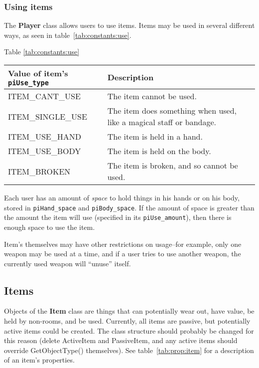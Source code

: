 \documentclass[12pt]{article}
\newcommand{\class}[1]{\textbf{#1}}
\newcommand{\prop}[1]{\texttt{#1}}
\begin{document}
\subsubsection{Using items}

The \class{Player} class allows users to use items.  Items may be used
in several different ways, as seen in table~\ref{tab:constants:use}.

\begin{center}
\begin{center}Table \ref{tab:constants:use} \end{center}
\begin{tabular}{||l|l||} \hline
Value of item's \prop{piUse\_type} & Description 
\\ \hline \hline
ITEM\_CANT\_USE &  The item cannot be used.
\\ \hline
ITEM\_SINGLE\_USE  &  The item does something when used, like a
magical staff or bandage.
\\ \hline
ITEM\_USE\_HAND &  The item is held in a hand.
\\ \hline
ITEM\_USE\_BODY &  The item is held on the body.
\\ \hline
ITEM\_BROKEN    &  The item is broken, and so cannot be used.
\\ \hline
\end{tabular}
\label{tab:constants:use}
\end{center}

Each user has an amount of \emph{space} to hold things in his hands or on
his body, stored in \prop{piHand\_space} and \prop{piBody\_space}.  If
the amount of space is greater than the amount the item will use
(specified in its \prop{piUse\_amount}), then there is enough space to
use the item.

Item's themselves may have other restrictions on usage--for example,
only one weapon may be used at a time, and if a user tries to use
another weapon, the currently used weapon will ``unuse'' itself.


\subsection{Items}

Objects of the \class{Item} class are things that can potentially wear out, have
value, be held by non-rooms, and be used.  Currently, all items are
passive, but potentially active items could be created.  The class
structure should probably be changed for this reason (delete
ActiveItem and PassiveItem, and any active items should override
GetObjectType() themselves).  See table~\ref{tab:prop:item} for a
description of an item's properties.
\end{document}
